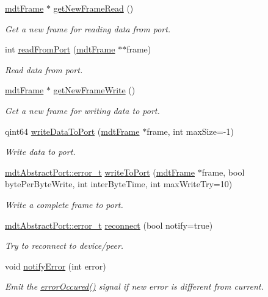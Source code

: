 \begin{DoxyCompactItemize}
\item 
\hyperlink{classmdt_frame}{mdtFrame} $\ast$ \hyperlink{classmdt_port_thread_a611211e56620ec9c699019452716e4fc}{getNewFrameRead} ()
\begin{DoxyCompactList}\small\item\em Get a new frame for reading data from port. \end{DoxyCompactList}\item 
int \hyperlink{classmdt_port_thread_a2e0c384ae6c909cb40fc0ca1a0189ca6}{readFromPort} (\hyperlink{classmdt_frame}{mdtFrame} $\ast$$\ast$frame)
\begin{DoxyCompactList}\small\item\em Read data from port. \end{DoxyCompactList}\item 
\hyperlink{classmdt_frame}{mdtFrame} $\ast$ \hyperlink{classmdt_port_thread_acba4fce38a633da68ec23fe191ba6105}{getNewFrameWrite} ()
\begin{DoxyCompactList}\small\item\em Get a new frame for writing data to port. \end{DoxyCompactList}\item 
qint64 \hyperlink{classmdt_port_thread_aa18ebea6a8791d228ab9575d1c68067c}{writeDataToPort} (\hyperlink{classmdt_frame}{mdtFrame} $\ast$frame, int maxSize=-\/1)
\begin{DoxyCompactList}\small\item\em Write data to port. \end{DoxyCompactList}\item 
\hyperlink{classmdt_abstract_port_ad4121bb930c95887e77f8bafa065a85e}{mdtAbstractPort::error\_\-t} \hyperlink{classmdt_port_thread_a2658d7f1a04ef10eb09d575d8d7eda43}{writeToPort} (\hyperlink{classmdt_frame}{mdtFrame} $\ast$frame, bool bytePerByteWrite, int interByteTime, int maxWriteTry=10)
\begin{DoxyCompactList}\small\item\em Write a complete frame to port. \end{DoxyCompactList}\item 
\hyperlink{classmdt_abstract_port_ad4121bb930c95887e77f8bafa065a85e}{mdtAbstractPort::error\_\-t} \hyperlink{classmdt_port_thread_abee1d2f9b67ca37cfd13e108ca978b36}{reconnect} (bool notify=true)
\begin{DoxyCompactList}\small\item\em Try to reconnect to device/peer. \end{DoxyCompactList}\item 
void \hyperlink{classmdt_port_thread_ad2c618a032c0aeed0f0cb3b30bc0aba9}{notifyError} (int error)
\begin{DoxyCompactList}\small\item\em Emit the \hyperlink{classmdt_port_thread_ab31cbe1a85aa830cd368654d1f806326}{errorOccured()} signal if new error is different from current. \end{DoxyCompactList}\end{DoxyCompactItemize}
